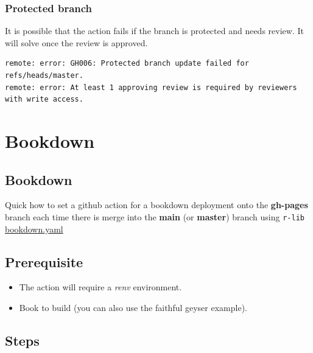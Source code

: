 \documentclass[
]{book}
\providecommand{\tightlist}{%
  \setlength{\itemsep}{0pt}\setlength{\parskip}{0pt}}
\begin{document}
\hypertarget{protected-branch}{%
\subsection{Protected branch}\label{protected-branch}}

It is possible that the action fails if the branch is protected and needs review. It will solve once the review is approved.

\begin{verbatim}
remote: error: GH006: Protected branch update failed for refs/heads/master.        
remote: error: At least 1 approving review is required by reviewers with write access. 
\end{verbatim}

\hypertarget{bookdown}{%
\chapter{Bookdown}\label{bookdown}}

\hypertarget{bookdown-1}{%
\section{Bookdown}\label{bookdown-1}}

Quick how to set a github action for a bookdown deployment onto the \textbf{gh-pages} branch each time there is merge into the \textbf{main} (or \textbf{master}) branch using \texttt{r-lib} \href{https://github.com/r-lib/actions/blob/v2-branch/examples/bookdown.yaml}{bookdown.yaml}

\hypertarget{prerequisite-3}{%
\section{Prerequisite}\label{prerequisite-3}}

\begin{itemize}
\tightlist
\item
  The action will require a \emph{renv} environment.
\item
  Book to build (you can also use the faithful geyser example).
\end{itemize}

\hypertarget{steps-3}{%
\section{Steps}\label{steps-3}}
\end{document}
